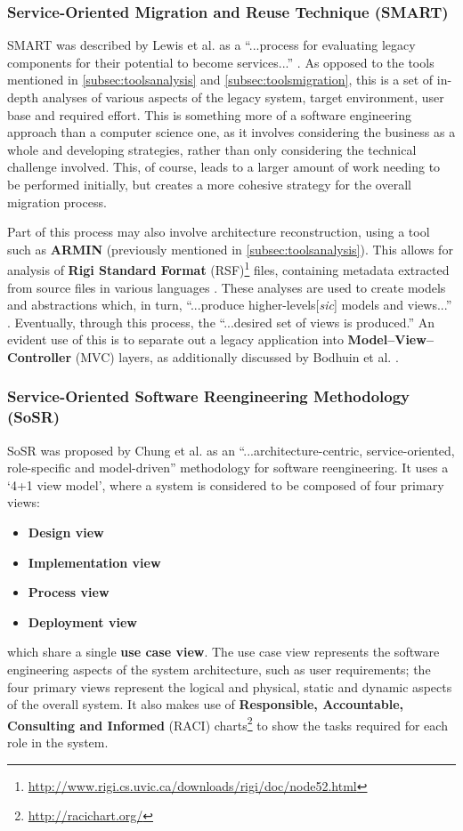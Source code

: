 \documentclass[12pt,journal,compsoc]{IEEEtran}
\begin{document}
\subsubsection{Service-Oriented Migration and Reuse Technique (SMART)}
\label{subsubsec:smart}
SMART was described by Lewis et al. as a ``...process for evaluating legacy components for their potential to become services...'' \cite{Lewis2005,Lewis2005a}. As opposed to the tools mentioned in \autoref{subsec:toolsanalysis} and \autoref{subsec:toolsmigration}, this is a set of in-depth analyses of various aspects of the legacy system, target environment, user base and required effort. This is something more of a software engineering approach than a computer science one, as it involves considering the business as a whole and developing strategies, rather than only considering the technical challenge involved. This, of course, leads to a larger amount of work needing to be performed initially, but creates a more cohesive strategy for the overall migration process.

Part of this process may also involve architecture reconstruction, using a tool such as \textbf{ARMIN} (previously mentioned in \autoref{subsec:toolsanalysis}). This allows for analysis of \textbf{Rigi Standard Format} (RSF)\footnote{\url{http://www.rigi.cs.uvic.ca/downloads/rigi/doc/node52.html}} files, containing metadata extracted from source files in various languages \cite{O'Brien2005}. These analyses are used to create models and abstractions which, in turn, ``...produce higher-levels[\textit{sic}] models and views...'' \cite{O'Brien2005}. Eventually, through this process, the ``...desired set of views is produced.'' \cite{O'Brien2005} An evident use of this is to separate out a legacy application into \textbf{Model--View--Controller} (MVC) layers, as additionally discussed by Bodhuin et al. \cite{Bodhuin2002}.

\subsubsection{Service-Oriented Software Reengineering Methodology (SoSR)}
\label{subsubsec:sosr}
SoSR was proposed by Chung et al. as an ``...architecture-centric, service-oriented, role-specific and model-driven'' \cite{Chung2007} methodology for software reengineering. It uses a `4+1 view model', where a system is considered to be composed of four primary views:
\begin{itemize}
\item \textbf{Design view}
\item \textbf{Implementation view}
\item \textbf{Process view}
\item \textbf{Deployment view}
\end{itemize}
which share a single \textbf{use case view}. The use case view represents the software engineering aspects of the system architecture, such as user requirements; the four primary views represent the logical and physical, static and dynamic aspects of the overall system. It also makes use of \textbf{Responsible, Accountable, Consulting and Informed} (RACI) charts\footnote{\url{http://racichart.org/}} to show the tasks required for each role in the system.
\end{document}
